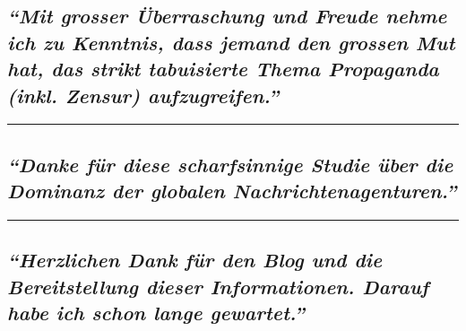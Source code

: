 \hypertarget{mit-grosser-uxfcberraschung-und-freude-nehme-ich-zu-kenntnis-dass-jemand-den-grossen-mut-hat-das-strikt-tabuisierte-thema-propaganda-inkl-zensur-aufzugreifen}{%
\subsection{\texorpdfstring{\emph{``Mit grosser Überraschung und Freude
nehme ich zu Kenntnis, dass jemand den grossen Mut hat, das strikt
tabuisierte Thema Propaganda (inkl. Zensur)
aufzugreifen.''}}{``Mit grosser Überraschung und Freude nehme ich zu Kenntnis, dass jemand den grossen Mut hat, das strikt tabuisierte Thema Propaganda (inkl. Zensur) aufzugreifen.''}}\label{mit-grosser-uxfcberraschung-und-freude-nehme-ich-zu-kenntnis-dass-jemand-den-grossen-mut-hat-das-strikt-tabuisierte-thema-propaganda-inkl-zensur-aufzugreifen}}

\begin{center}\rule{0.5\linewidth}{\linethickness}\end{center}

\hypertarget{danke-fuxfcr-diese-scharfsinnige-studie-uxfcber-die-dominanz-der-globalen-nachrichtenagenturen}{%
\subsection{\texorpdfstring{\emph{``Danke für diese scharfsinnige Studie
über die Dominanz der globalen
Nachrichtenagenturen.''}}{``Danke für diese scharfsinnige Studie über die Dominanz der globalen Nachrichtenagenturen.''}}\label{danke-fuxfcr-diese-scharfsinnige-studie-uxfcber-die-dominanz-der-globalen-nachrichtenagenturen}}

\begin{center}\rule{0.5\linewidth}{\linethickness}\end{center}

\hypertarget{herzlichen-dank-fuxfcr-den-blog-und-die-bereitstellung-dieser-informationen-darauf-habe-ich-schon-lange-gewartet}{%
\subsection{\texorpdfstring{\emph{``Herzlichen Dank für den Blog und die
Bereitstellung dieser Informationen. Darauf habe ich schon lange
gewartet.''}}{``Herzlichen Dank für den Blog und die Bereitstellung dieser Informationen. Darauf habe ich schon lange gewartet.''}}\label{herzlichen-dank-fuxfcr-den-blog-und-die-bereitstellung-dieser-informationen-darauf-habe-ich-schon-lange-gewartet}}

